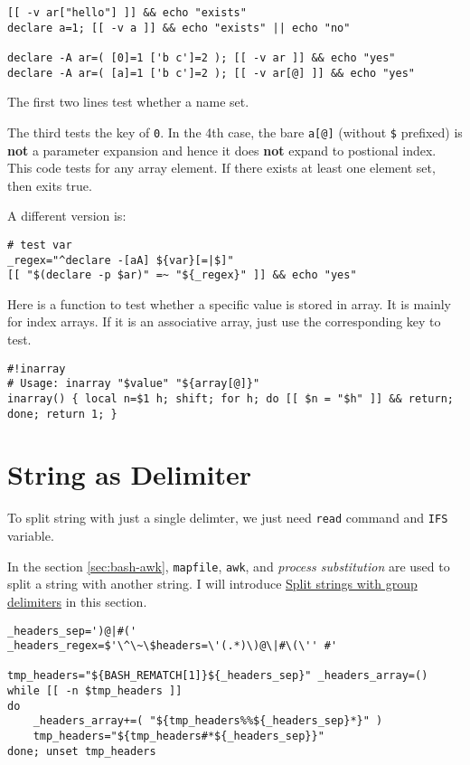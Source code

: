 \begin{lstlisting}
[[ -v ar["hello"] ]] && echo "exists"
declare a=1; [[ -v a ]] && echo "exists" || echo "no"

declare -A ar=( [0]=1 ['b c']=2 ); [[ -v ar ]] && echo "yes"
declare -A ar=( [a]=1 ['b c']=2 ); [[ -v ar[@] ]] && echo "yes"
\end{lstlisting}

The first two lines test whether a name set.

The third tests the key of \verb|0|. In the 4th case, the bare
\verb|a[@]| (without
\verb|$| prefixed) is \textbf{not} a parameter expansion and hence
it does \textbf{not} expand to postional index. This code tests
for any array element. If there exists at least one element set,
then exits true.

A different version is:

\begin{lstlisting}
# test var
_regex="^declare -[aA] ${var}[=|$]"
[[ "$(declare -p $ar)" =~ "${_regex}" ]] && echo "yes"
\end{lstlisting}

Here is a function to test whether a specific value is stored in
array. It is mainly for index arrays. If it is an associative
array, just use the corresponding key to test.

\begin{lstlisting}
#!inarray
# Usage: inarray "$value" "${array[@]}"
inarray() { local n=$1 h; shift; for h; do [[ $n = "$h" ]] && return; done; return 1; }
\end{lstlisting}

\section{String as Delimiter}
\label{sec:bash-str-as-delim}

To split string with just a single delimter, we just need
\lstinline|read| command and \lstinline|IFS| variable.

In the section \ref{sec:bash-awk}, \lstinline|mapfile|,
\lstinline{awk}, and \textit{process substitution} are used to
split a string with another string. I will introduce
\href{https://www.tutorialkart.com/bash-shell-scripting/bash-split-string/#split-string-with-multiple-character-delimiter}{Split
  strings with group delimiters} in this section.

\begin{minipage}{1.0\linewidth}
\begin{lstlisting}
_headers_sep=')@|#('
_headers_regex=$'\^\~\$headers=\'(.*)\)@\|#\(\'' #'

tmp_headers="${BASH_REMATCH[1]}${_headers_sep}" _headers_array=()
while [[ -n $tmp_headers ]]
do
    _headers_array+=( "${tmp_headers%%${_headers_sep}*}" )
    tmp_headers="${tmp_headers#*${_headers_sep}}"
done; unset tmp_headers
\end{lstlisting}
\end{minipage}

